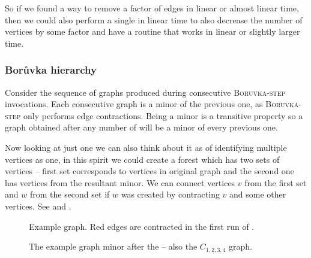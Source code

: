 So if we found a way to remove a factor of edges in linear or almost linear time, then we could also perform a single  in linear time to also decrease the number of vertices by some factor and have a routine that works in linear or slightly larger time.

\subsubsection{Borůvka hierarchy}
Consider the sequence of graphs produced during consecutive \textsc{Boruvka-step} invocations. Each consecutive graph is a minor of the previous one, as \textsc{Boruvka-step} only performs edge contractions. Being a minor is a transitive property so a graph obtained after any number of  will be a minor of every previous one.

Now looking at just one  we can also think about it as of identifying multiple vertices as one, in this spirit we could create a forest which has two sets of vertices -- first set corresponds to vertices in original graph and the second one has vertices from the resultant minor. We can connect vertices $v$ from the first set and $w$ from the second set if $w$ was created by contracting $v$ and some other vertices. See  and .

\begin{figure}[ht!]
    \centering
    \caption{Example graph. Red edges are contracted in the first run of .}
    \label{fig-mst}
\end{figure}

\begin{figure}[ht!]
    \centering
    \caption{The example graph minor after the  -- also the $C_{1,2,3,4}$ graph.}
\end{figure}

